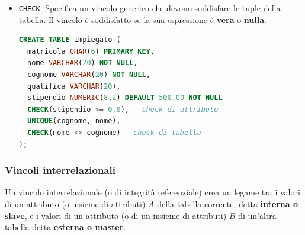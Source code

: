 \documentclass[a4paper]{article}
\begin{document}
\begin{itemize}
\begin{itemize}
      \item Nel vincolo della tabella se la chiave primaria è composta da più attributi:
\begin{lstlisting}[language=SQL]
nome VARCHAR(20),
cognome VARCHAR(20),
PRIMARY KEY(nome, cognome)
\end{lstlisting}
    \end{itemize}

  \item \texttt{CHECK}: Specifica un vincolo generico che devono soddisfare le tuple
    della tabella. Il vincolo è soddisfatto se la sua espressione è \textbf{vera}
    o \textbf{nulla}.

\begin{lstlisting}[language=SQL, numbers=none]
CREATE TABLE Impiegato (
  matricola CHAR(6) PRIMARY KEY,
  nome VARCHAR(20) NOT NULL,
  cognome VARCHAR(20) NOT NULL,
  qualifica VARCHAR(20),
  stipendio NUMERIC(8,2) DEFAULT 500.00 NOT NULL
  CHECK(stipendio >= 0.0), --check di attributo
  UNIQUE(cognome, nome),
  CHECK(nome <> cognome) --check di tabella
);
\end{lstlisting}
\end{itemize}

\subsubsection{Vincoli interrelazionali}
Un vincolo interrelazionale (o di integrità referenziale) crea un legame tra i valori
di un attributo (o insieme di attributi) \( A \) della tabella corrente, detta
\textbf{interna o slave}, e i valori di un attributo (o di un insieme di attributi)
\( B \) di un'altra tabella detta \textbf{esterna o master}.
\end{document}
